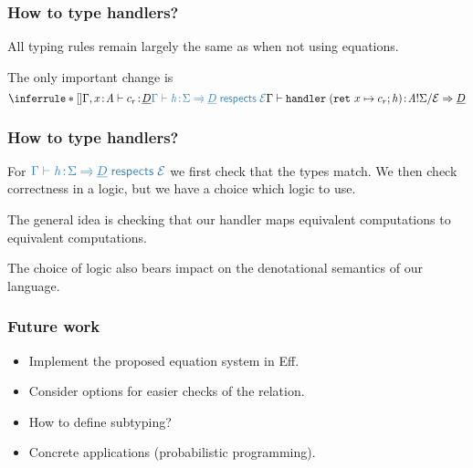 \documentclass[usenames,dvipsnames]{beamer}
\begin{document}
\begin{frame}
	\frametitle{How to type handlers?}
	All typing rules remain largely the same as when not using equations.

	\vspace{5mm}

	The only important change is
	\[
		\inferrule*[]
		{
			\judgement{\ctx, x \oftype \tyA}{c_r}{\ctyD}
			\\
			\new{\respects{\hcases}{\eqE}{\sig}{\ctyD}}
			\\
		}
		{\judgement{\ctx}
			{\handler{\hcases}}
			{\ctype{\tyA}{\sig}{\eqE} \hto \ctyD}
		}
	\]

\end{frame}

\begin{frame}
	\frametitle{How to type handlers?}
	
	For $\new{\respects{\hcases}{\eqE}{\sig}{\ctyD}}$ we first check that the types match. We then check correctness in a logic, but we have a choice which logic to use.

	\vspace{5mm}

	The general idea is checking that our handler maps equivalent computations to equivalent computations.

	\vspace{5mm}

	The choice of logic also bears impact on the denotational semantics of our language.

\end{frame}
\begin{frame}
	\frametitle{Future work}
	
	\begin{itemize}
		\item Implement the proposed equation system in Eff.
		\item Consider options for easier checks of the  relation.
		\item How to define subtyping?
		\item Concrete applications (probabilistic programming).
	\end{itemize}

\end{frame}
\end{document}
